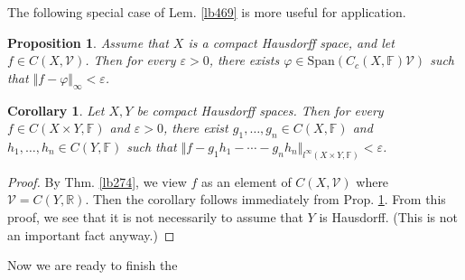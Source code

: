 \documentclass[12pt,b5paper,notitlepage]{article}
\theoremstyle{definition}
\theoremstyle{plain}
\newtheorem{pp}[df]{Proposition}
\newtheorem{co}[df]{Corollary}
\newcommand{\mc}{\mathcal}
\newcommand{\Span}{\mathrm{Span}}
\newcommand{\Rbb}{\mathbb R}
\newcommand{\Fbb}{\mathbb F}
\newcommand{\eps}{\varepsilon}
\numberwithin{equation}{section}
\begin{document}
The following special case of Lem. \ref{lb469} is more useful for application.

\begin{pp}\label{lb470}
Assume that $X$ is a compact Hausdorff space, and let $f\in C(X,\mc V)$. Then for every $\eps>0$, there exists $\varphi\in\Span(C_c(X,\Fbb)\mc V)$ such that $\Vert f-\varphi\Vert_\infty<\eps$.
\end{pp}



\begin{co}\label{lb471}
Let $X,Y$ be compact Hausdorff spaces. Then for every $f\in C(X\times Y,\Fbb)$ and $\eps>0$, there exist $g_1,\dots,g_n\in C(X,\Fbb)$ and $h_1,\dots,h_n\in C(Y,\Fbb)$ such that $\Vert f-g_1h_1-\cdots-g_nh_n\Vert_{l^\infty(X\times Y,\Fbb)}<\eps$.
\end{co}


\begin{proof}
By Thm. \ref{lb274}, we view $f$ as an element of $C(X,\mc V)$ where $\mc V=C(Y,\Rbb)$. Then the corollary follows immediately from Prop. \ref{lb470}. From this proof, we see that it is not necessarily to assume that $Y$ is Hausdorff. (This is not an important fact anyway.)
\end{proof}


Now we are ready to finish the
\end{document}
